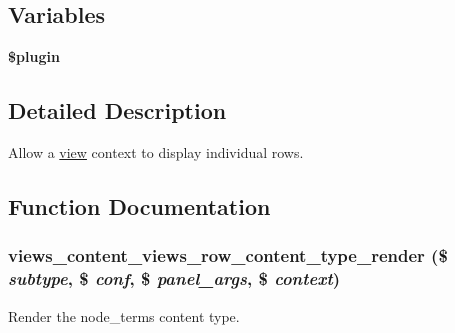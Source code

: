 \subsection*{Variables}
\begin{DoxyCompactItemize}
\item 
{\bfseries \$plugin}
\end{DoxyCompactItemize}


\subsection{Detailed Description}
Allow a \hyperlink{classview}{view} context to display individual rows. 

\subsection{Function Documentation}
\hypertarget{views__row_8inc_addde1c53bf68173bf2250309e339bf5b}{
\subsubsection[{views\_\-content\_\-views\_\-row\_\-content\_\-type\_\-render}]{\setlength{\rightskip}{0pt plus 5cm}views\_\-content\_\-views\_\-row\_\-content\_\-type\_\-render (\$ {\em subtype}, \/  \$ {\em conf}, \/  \$ {\em panel\_\-args}, \/  \$ {\em context})}}
\label{views__row_8inc_addde1c53bf68173bf2250309e339bf5b}
Render the node\_\-terms content type. 

